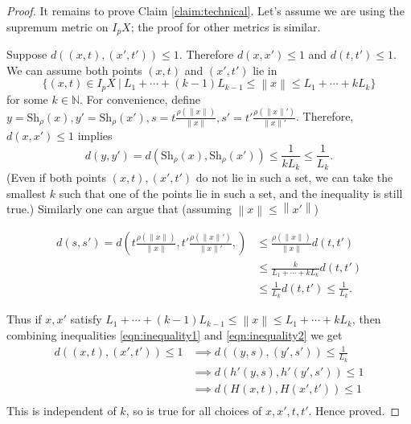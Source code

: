 \documentclass {amsart}
\newcommand {\N}        {\mathbb{N}}
\newcommand {\shr}      {\text {Sh} _{\rho}}
\newcommand {\norm} [1] {\left\| #1 \right\|}
\theoremstyle {definition}
\begin{document}
\begin{proof}
It remains to prove Claim \ref{claim:technical}. Let's assume we are using the
supremum metric on \( I_p X \); the proof for other metrics is similar.

  Suppose \( d((x,t), (x',t')) \leq 1 \). Therefore \( d(x,x') \leq 1 \) and \(
  d(t,t') \leq 1\). We can assume both points \( (x,t) \) and \( (x',t') \) lie
  in
  \begin{equation*}
    \{ (x,t) \in I_p X \ | \ 
    L_1 + \cdots + (k-1) L_{k-1} \leq \norm x \leq
    L_1 + \cdots + k L_k\}
  \end{equation*}
  for some \( k \in \N \). For convenience, define \( y = \shr(x), y'= \shr(x'),
  s = t \frac {\rho (\norm x)} {\norm x}, s' = t' \frac {\rho (\norm x')} {\norm
    x'}\). Therefore, \( d(x, x') \leq 1 \) implies
  \begin{equation} \label{eqn:inequality1}
    d (y, y') = d (\shr (x), \shr(x')) \leq \frac {1} {k L_k}
       \leq \frac {1} {L_k}.
  \end{equation}
  (Even if both points \( (x,t), (x',t') \) do not lie in such a set, we can take
  the smallest \( k \) such that one of the points lie in such a set, and the
  inequality is still true.)
  Similarly one can argue that (assuming \( \norm x \leq \norm {x'} \))

  \begin{equation} \label{eqn:inequality2}
    \begin {aligned}
    d (s, s') = 
      d \left(
        t \frac {\rho (\norm x)} {\norm x},
        t' \frac {\rho (\norm x')} {\norm x'},
      \right)
        & \leq \frac {\rho (\norm x)} {\norm x} d(t, t') \\
        & \leq \frac {k} {L_1 + \cdots + k L_k} d (t, t') \\
        & \leq \frac {1} {L_k} d(t, t') \leq \frac {1} {L_k}.
    \end {aligned}
  \end{equation}

  Thus if \( x, x' \) satisfy \( L_1 + \cdots + (k-1) L_{k-1} \leq \norm {x}
  \leq L_1 + \cdots + k L _k \), then combining inequalities
  \ref{eqn:inequality1} and \ref{eqn:inequality2} we get 
  \begin{equation*}
    \begin {aligned}
     d((x,t), (x', t')) \leq 1 
       & \implies d((y, s), (y', s')) \leq \frac {1} {L_k} \\
       & \implies d(h'(y, s), h'(y', s')) \leq 1 \\
       & \implies d(H(x, t), H(x', t')) \leq 1 \\
    \end {aligned}
  \end{equation*}
  This is independent of \( k \), so is true for all choices of \( x,x', t,
  t'\). Hence proved.
\end{proof}
\end{document}

